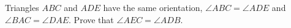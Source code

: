 Triangles $ABC$ and $ADE$ have the same orientation, $\angle ABC=\angle ADE$ and $\angle BAC=\angle DAE$. Prove that $\angle AEC=\angle ADB$.
